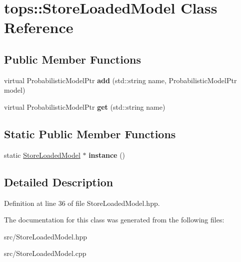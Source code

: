 \hypertarget{classtops_1_1StoreLoadedModel}{}\section{tops\+:\+:Store\+Loaded\+Model Class Reference}
\label{classtops_1_1StoreLoadedModel}
\subsection*{Public Member Functions}
\begin{DoxyCompactItemize}
\item 
\mbox{\label{classtops_1_1StoreLoadedModel_a50fc812c6e526a0738935725de58d64e}} 
virtual Probabilistic\+Model\+Ptr {\bfseries add} (std\+::string name, Probabilistic\+Model\+Ptr model)
\item 
\mbox{\label{classtops_1_1StoreLoadedModel_a4e1ab8464047f7e0fd69aac01c7efeb6}} 
virtual Probabilistic\+Model\+Ptr {\bfseries get} (std\+::string name)
\end{DoxyCompactItemize}
\subsection*{Static Public Member Functions}
\begin{DoxyCompactItemize}
\item 
\mbox{\label{classtops_1_1StoreLoadedModel_ac4711bb0d7716d99914436e5fe334c0a}} 
static \hyperlink{classtops_1_1StoreLoadedModel}{Store\+Loaded\+Model} $\ast$ {\bfseries instance} ()
\end{DoxyCompactItemize}


\subsection{Detailed Description}


Definition at line 36 of file Store\+Loaded\+Model.\+hpp.



The documentation for this class was generated from the following files\+:\begin{DoxyCompactItemize}
\item 
src/Store\+Loaded\+Model.\+hpp\item 
src/Store\+Loaded\+Model.\+cpp\end{DoxyCompactItemize}
